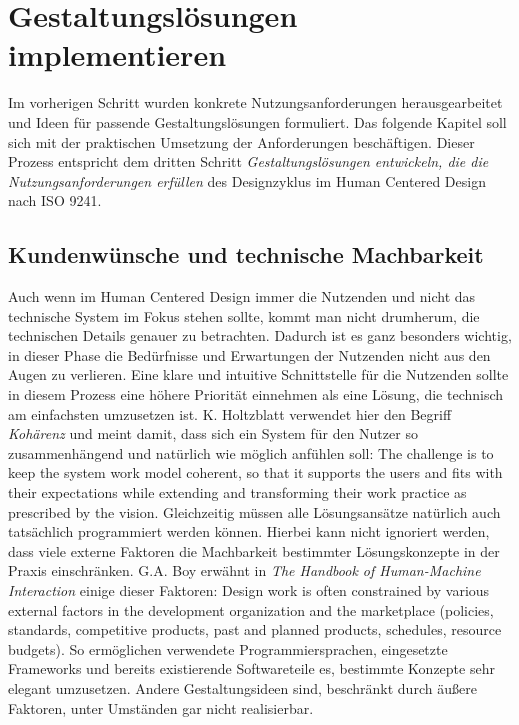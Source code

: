 \chapter{Gestaltungslösungen implementieren}
\label{chapter:implementation}

Im vorherigen Schritt wurden konkrete Nutzungsanforderungen herausgearbeitet
und Ideen für passende Gestaltungslösungen formuliert. Das folgende
Kapitel soll sich mit der praktischen Umsetzung der Anforderungen beschäftigen.
Dieser Prozess entspricht dem dritten Schritt \textit{Gestaltungslösungen
    entwickeln, die die Nutzungsanforderungen erfüllen} des Designzyklus im Human
Centered Design nach ISO 9241\cite{ISO9241}.

\section{Kundenwünsche und technische Machbarkeit}
Auch wenn im Human Centered Design immer die Nutzenden und nicht das technische
System im Fokus stehen sollte, kommt man nicht drumherum, die technischen
Details genauer zu betrachten. Dadurch ist es ganz besonders wichtig, in dieser
Phase die Bedürfnisse und Erwartungen der Nutzenden nicht aus den Augen zu
verlieren. Eine klare und intuitive Schnittstelle für die Nutzenden sollte in
diesem Prozess eine höhere Priorität einnehmen als eine Lösung, die technisch
am einfachsten umzusetzen ist. K. Holtzblatt verwendet hier den Begriff
\textit{Kohärenz} und meint damit, dass sich ein System für den Nutzer so
zusammenhängend und natürlich wie möglich anfühlen soll: \glqq{}The challenge
is to keep the system work model coherent, so that it supports the users and
fits with their expectations while extending and transforming their work
practice as prescribed by the vision.\grqq{}\cite{contextualDesign}
Gleichzeitig müssen alle Lösungsansätze natürlich auch tatsächlich programmiert
werden können. Hierbei kann nicht ignoriert werden, dass viele externe Faktoren
die Machbarkeit bestimmter Lösungskonzepte in der Praxis einschränken. G.A. Boy
erwähnt in \textit{The Handbook of Human-Machine Interaction} einige dieser
Faktoren: \glqq{}Design work is often constrained by various external factors
in the development organization and the marketplace (policies, standards,
competitive products, past and planned products, schedules, resource
budgets).\grqq\cite{HMI-HCD} So ermöglichen verwendete Programmiersprachen,
eingesetzte Frameworks und bereits existierende Softwareteile es, bestimmte
Konzepte sehr elegant umzusetzen. Andere Gestaltungsideen sind, beschränkt
durch äußere Faktoren, unter Umständen gar nicht realisierbar\cite{HMI-HCD}.

